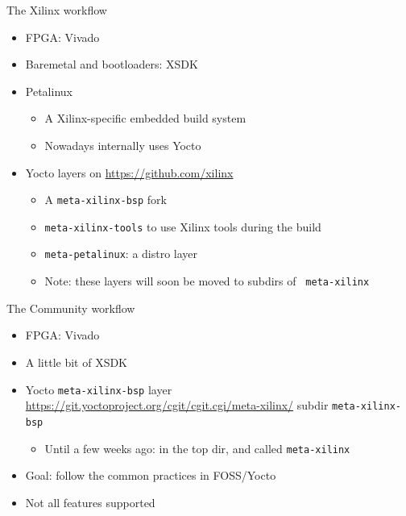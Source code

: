 \documentclass[xetex,table]{beamer}
\begin{document}
\begin{frame}{The Xilinx workflow}
  \begin{itemize}
  \item FPGA: Vivado
  \item Baremetal and bootloaders: XSDK
  \item Petalinux
    \begin{itemize}
    \item A Xilinx-specific embedded build system
    \item Nowadays internally uses Yocto
    \end{itemize}
  \item Yocto layers on \url{https://github.com/xilinx}
    \begin{itemize}
    \item A {\tt meta-xilinx-bsp} fork
    \item {\tt meta-xilinx-tools} to use Xilinx tools during the build
    \item {\tt meta-petalinux}: a distro layer
    \item Note: these layers will soon be moved to subdirs of {\tt
      meta-xilinx}
  \end{itemize}
  \end{itemize}
\end{frame}

\begin{frame}{The Community workflow}
  \begin{itemize}
  \item FPGA: Vivado
  \item A little bit of XSDK
  \item Yocto {\tt meta-xilinx-bsp} layer\\
    {\footnotesize\url{https://git.yoctoproject.org/cgit/cgit.cgi/meta-xilinx/}}
    subdir {\tt meta-xilinx-bsp}
    \begin{itemize}
      \item Until a few weeks ago: in the top dir, and called {\tt meta-xilinx}
  \end{itemize}
  \item Goal: follow the common practices in FOSS/Yocto
  \item Not all features supported
  \end{itemize}
\end{frame}
\end{document}
